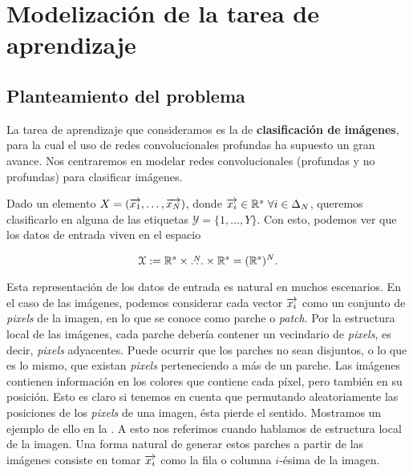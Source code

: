 \chapter{Modelización de la tarea de aprendizaje} \label{ch:tarea_aprendizaje}

\section{Planteamiento del problema} \label{seq:planteamiento_problema}

La tarea de aprendizaje que consideramos es la de \textbf{clasificación de imágenes}, para la cual el uso de redes convolucionales profundas ha supuesto un gran avance. Nos centraremos en modelar redes convolucionales (profundas y no profundas) para clasificar imágenes.

Dado un elemento $X = (\overrightarrow{x_1}, \ldots, \overrightarrow{x_N})$, donde $\nv{x_i} \in \R^s \ \forall i \in \deltaset{N}$, queremos clasificarlo en alguna de las etiquetas $\mathcal{Y} = \{1, \ldots, Y \}$. Con esto, podemos ver que los datos de entrada viven en el espacio

\begin{equation}
	\mathcal{X} := \mathbb{R}^s \times \overset{N}{\ldots} \times \mathbb{R}^s = (\mathbb{R}^s)^N.
\end{equation}

Esta representación de los datos de entrada es natural en muchos escenarios. En el caso de las imágenes, podemos considerar cada vector $\overrightarrow{x_i}$ como un conjunto de \textit{pixels} de la imagen, en lo que se conoce como parche o \textit{patch}. Por la estructura local de las imágenes, cada parche debería contener un vecindario de \textit{pixels}, es decir, \textit{pixels} adyacentes. Puede ocurrir que los parches no sean disjuntos, o lo que es lo mismo, que existan \textit{pixels} perteneciendo a más de un parche. Las imágenes contienen información en los colores que contiene cada píxel, pero también en su posición. Esto es claro si tenemos en cuenta que permutando aleatoriamente las posiciones de los \textit{pixels} de una imagen, ésta pierde el sentido. Mostramos un ejemplo de ello en la . A esto nos referimos cuando hablamos de estructura local de la imagen. Una forma natural de generar estos parches a partir de las imágenes consiste en tomar $\overrightarrow{x_i}$ como la fila o columna $i$-ésima de la imagen.

